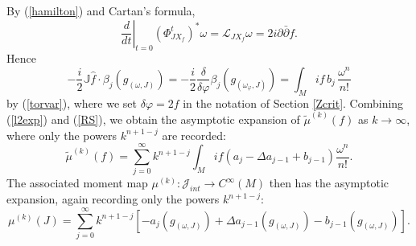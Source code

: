 \documentclass[12pt,reqno,a4paper]{amsart}
\numberwithin{equation}{section}
\theoremstyle{definition}
\theoremstyle{remark}
\begin{document}
By (\ref{hamilton}) and Cartan's formula,
\begin{equation*}
\left.\frac{d}{dt}\right|_{t=0}(\Phi^{t}_{JX_f})^*\omega=\mathcal{L}_{JX_f}\omega=2i\partial\bar{\partial}f.
\end{equation*}
Hence
\begin{equation}\label{RS}
-\frac{i}{2}\mathbb{J}\widehat{f}\cdot\beta_j(g_{(\omega,J)})=-\frac{i}{2}\frac{\delta}{\delta \varphi}\beta_j(g_{(\omega_\varphi,J)})=\int_M if\,b_j \,\frac{\omega^n}{n!}
\end{equation}
by (\ref{torvar}), where we set $\delta \varphi=2f$ in the notation of Section \ref{Zcrit}.
Combining (\ref{l2exp}) and (\ref{RS}), we obtain the asymptotic expansion of $\widetilde{\mu}^{(k)}(f)$ as $k\rightarrow\infty$, where only the powers $k^{n+1-j}$ are recorded:
\begin{equation*}
\widetilde{\mu}^{(k)}(f)=\sum_{j=0}^\infty k^{n+1-j}\int_M if(a_j-\Delta a_{j-1}+b_{j-1} )\frac{\omega^n}{n!}.
\end{equation*}
The associated moment map $\mu^{(k)}:\mathcal{J}_{int}\rightarrow C^\infty(M)$ then has the asymptotic expansion, again recording only the powers $k^{n+1-j}$:
\begin{equation*}
\mu^{(k)}(J)=\sum_{j=0}^\infty k^{n+1-j}\left[-a_j\left(g_{(\omega,J)}\right)+\Delta a_{j-1}\left(g_{(\omega,J)}\right)-b_{j-1}\left(g_{(\omega,J)}\right) \right].
\end{equation*}
\end{document}
